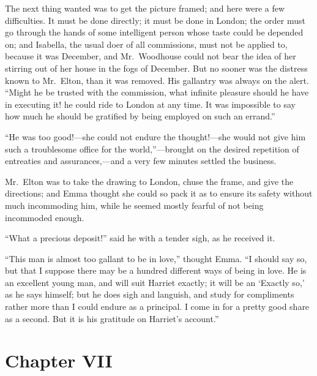 The next thing wanted was to get the picture framed; and here were a
few difficulties.  It must be done directly; it must be done in London;
the order must go through the hands of some intelligent person whose taste
could be depended on; and Isabella, the usual doer of all commissions,
must not be applied to, because it was December, and Mr.\ Woodhouse
could not bear the idea of her stirring out of her house in the fogs
of December.  But no sooner was the distress known to Mr.\ Elton,
than it was removed.  His gallantry was always on the alert.
``Might he be trusted with the commission, what infinite pleasure
should he have in executing it! he could ride to London at any time.
It was impossible to say how much he should be gratified by being
employed on such an errand.''

``He was too good!---she could not endure the thought!---she would
not give him such a troublesome office for the world,''---brought
on the desired repetition of entreaties and assurances,---and
a very few minutes settled the business.

Mr.\ Elton was to take the drawing to London, chuse the frame,
and give the directions; and Emma thought she could so pack it
as to ensure its safety without much incommoding him, while he
seemed mostly fearful of not being incommoded enough.

``What a precious deposit!'' said he with a tender sigh, as he
received it.

``This man is almost too gallant to be in love,'' thought Emma.
``I should say so, but that I suppose there may be a hundred different
ways of being in love.  He is an excellent young man, and will suit
Harriet exactly; it will be an `Exactly so,' as he says himself;
but he does sigh and languish, and study for compliments rather more
than I could endure as a principal.  I come in for a pretty good
share as a second.  But it is his gratitude on Harriet's account.''



\chapter{Chapter VII}


